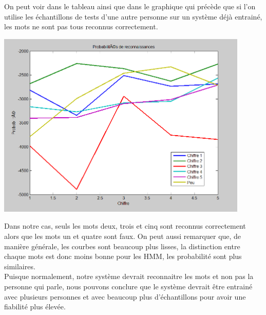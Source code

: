 On peut voir dans le tableau ainsi que dans le graphique qui précède que si l'on utilise les échantillons de tests d'une autre personne sur un système déjà entrainé, les mots ne sont pas tous reconnus correctement.

\begin{center}
\includegraphics[width=12cm]{Ressources/Graphiques/ProbaReconnTout_croise.png} 
\end{center}

Dans notre cas, seuls les mots deux, trois et cinq sont reconnus correctement alors que les mots un et quatre sont faux. On peut aussi remarquer que, de manière générale, les courbes sont beaucoup plus lisses, la distinction entre chaque mots est donc moins bonne pour les HMM, les probabilité sont plus similaires.
\\
Puisque normalement, notre système devrait reconnaitre les mots et non pas la personne qui parle, nous pouvons conclure que le système devrait être entrainé avec plusieurs personnes et avec beaucoup plus d'échantillons pour avoir une fiabilité plus élevée.




